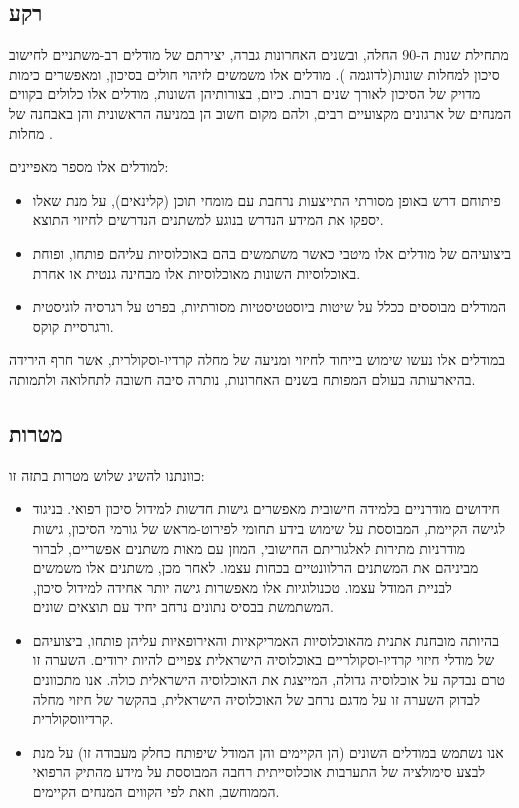 \documentclass[a4paper,12pt]{article}
\begin{document}
	\begin{hebrew}
		\subsection*{רקע}
				מתחילת שנות ה-90 החלה, ובשנים האחרונות גברה, יצירתם של מודלים רב-משתניים לחישוב סיכון למחלות שונות(לדוגמה \cite{Wilson1998,Conroy2003,DAgostino2008}). מודלים אלו משמשים לזיהוי חולים בסיכון, ומאפשרים כימות מדויק של הסיכון לאורך שנים רבות\cite{Goff2014}. כיום, בצורותיהן השונות, מודלים אלו כלולים בקווים המנחים של ארגונים מקצועיים רבים, ולהם מקום חשוב הן במניעה הראשונית והן באבחנה של מחלות \cite{Graham2007,Goff2014}.
			
			למודלים אלו מספר מאפיינים:
			\begin{itemize}
				\item פיתוחם דרש באופן מסורתי התייצעות נרחבת עם מומחי תוכן (קלינאים), על מנת שאלו יספקו את המידע הנדרש בנוגע למשתנים הנדרשים לחיזוי התוצא.
				\item ביצועיהם של מודלים אלו מיטבי כאשר משתמשים בהם באוכלוסיות עליהם פותחו, ופוחת באוכלוסיות השונות מאוכלוסיות אלו מבחינה גנטית או אחרת\cite{DAgostino2001,Bastuji-Garin2002,DeFilippis2015}.
				\item המודלים מבוססים ככלל על שיטות ביוסטטיסטיות מסורתיות, בפרט על רגרסיה לוגיסטית ורגרסיית קוקס.
			\end{itemize}
		
		במודלים אלו נעשו שימוש בייחוד לחיזוי ומניעה של מחלה קרדיו-וסקולרית, אשר חרף הירידה בהיארעותה בעולם המפותח בשנים האחרונות\cite{Koton2014,Vangen-Loenne2017}, נותרה סיבה חשובה לתחלואה ולתמותה\cite{ODonnell2016}.
				
		\subsection*{מטרות}
			כוונתנו להשיג שלוש מטרות בתזה זו:
			\begin{itemize}
				\item חידושים מודרניים בלמידה חישובית מאפשרים גישות חדשות למידול סיכון רפואי\cite{Obermeyer2016}. בניגוד לגישה הקיימת, המבוססת על שימוש בידע תחומי לפירוט-מראש של גורמי הסיכון, גישות מודרניות מתירות לאלגוריתם החישובי, המוזן עם מאות משתנים אפשריים, לברור מביניהם את המשתנים הרלוונטיים בכחות עצמו\cite{Weng2017}. לאחר מכן, משתנים אלו משמשים לבניית המודל עצמו. טכנולוגיות אלו מאפשרות גישה יותר אחידה למידול סיכון, המשתמשת בבסיס נתונים נרחב יחיד עם תוצאים שונים\cite{Rajkomar2018}.
				\item בהיותה מובחנת אתנית מהאוכלוסיות האמריקאיות והאירופאיות עליהן פותחו, ביצועיהם של מודלי חיזוי קרדיו-וסקולריים באוכלוסיה הישראלית צפויים להיות ירודים. השערה זו טרם נבדקה על אוכלוסיה גדולה, המייצגת את האוכלוסיה הישראלית כולה\cite{Lovis2015}. אנו מתכוונים לבדוק השערה זו על מדגם נרחב של האוכלוסיה הישראלית, בהקשר של חיזוי מחלה קרדיווסקולרית.
				\item אנו נשתמש במודלים השונים (הן הקיימים והן המודל שיפותח כחלק מעבודה זו) על מנת לבצע סימולציה של התערבות אוכלוסייתית רחבה המבוססת על מידע מהתיק הרפואי הממוחשב, וזאת לפי הקווים המנחים הקיימים\cite{Goff2014}.
			\end{itemize}
		

\end{hebrew}
\end{document}
